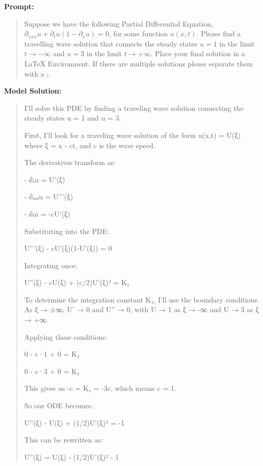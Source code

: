 \documentclass{article}
\begin{document}
\textbf{Prompt:}
\begin{quote}
Suppose we have the following Partial Differential Equation, $\partial_{xxx}u + \partial_{t}u(1-\partial_xu)= 0$, for some function $u(x,t)$. Please find a travelling wave solution that connects the steady states $u = 1$ in the limit $t \rightarrow -\infty $ and $u = 3$ in the limit $t \rightarrow +\infty$. Place your final solution in a $\boxed{}$ LaTeX Environment. If there are multiple solutions please separate them with a ;.
\end{quote}
\textbf{Model Solution:}
\begin{quote}
I'll solve this PDE by finding a traveling wave solution connecting the steady states u = 1 and u = 3.



First, I'll look for a traveling wave solution of the form u(x,t) = U(ξ) where ξ = x - ct, and c is the wave speed.



The derivatives transform as:

- ∂ₓu = U'(ξ)

- ∂ₓₓₓu = U'''(ξ)

- ∂ₜu = -cU'(ξ)



Substituting into the PDE:

U'''(ξ) - cU'(ξ)(1-U'(ξ)) = 0



Integrating once:

U''(ξ) - cU(ξ) + (c/2)U'(ξ)² = K₁



To determine the integration constant K₁, I'll use the boundary conditions. As ξ → ±∞, U' → 0 and U'' → 0, with U → 1 as ξ → -∞ and U → 3 as ξ → +∞.



Applying these conditions:

0 - c·1 + 0 = K₁

0 - c·3 + 0 = K₁



This gives us -c = K₁ = -3c, which means c = 1.



So our ODE becomes:

U''(ξ) - U(ξ) + (1/2)U'(ξ)² = -1



This can be rewritten as:

U''(ξ) = U(ξ) - (1/2)U'(ξ)² - 1




\end{quote}
\end{document}
